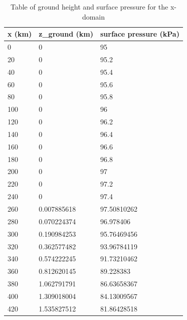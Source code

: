 \documentclass[12pt]{article}
\begin{document}
\begin{longtable}{|l|l|l|}
\caption {Table of ground height and surface pressure for the x-domain} \\
    \hline
    \textbf{x (km)} & \textbf{z\_ground (km)} & \textbf{surface pressure (kPa)} \\ \hline
    \hline
    \endhead

    0      & 0              & 95                     \\ \hline
    20     & 0              & 95.2                   \\ \hline
    40     & 0              & 95.4                   \\ \hline
    60     & 0              & 95.6                   \\ \hline
    80     & 0              & 95.8                   \\ \hline
    100    & 0              & 96                     \\ \hline
    120    & 0              & 96.2                   \\ \hline
    140    & 0              & 96.4                   \\ \hline
    160    & 0              & 96.6                   \\ \hline
    180    & 0              & 96.8                   \\ \hline
    200    & 0              & 97                     \\ \hline
    220    & 0              & 97.2                   \\ \hline
    240    & 0              & 97.4                   \\ \hline
    260    & 0.007885618    & 97.50810262            \\ \hline
    280    & 0.070224374    & 96.978406              \\ \hline
    300    & 0.190984253    & 95.76469456            \\ \hline
    320    & 0.362577482    & 93.96784119            \\ \hline
    340    & 0.574222245    & 91.73210462            \\ \hline
    360    & 0.812620145    & 89.228383              \\ \hline
    380    & 1.062791791    & 86.63658367            \\ \hline
    400    & 1.309018004    & 84.13009567            \\ \hline
    420    & 1.535827512    & 81.86428518            \\ \hline

\end{longtable}
\end{document}

